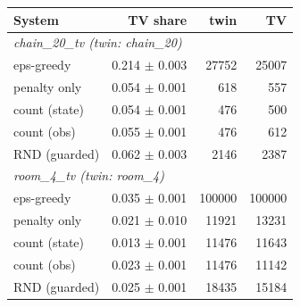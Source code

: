 \begin{tabular}{lrrr}
\hline
System & TV share & twin & TV \\
\hline
\multicolumn{4}{l}{\emph{chain\_20\_tv (twin: chain\_20)}} \\
eps-greedy & 0.214 $\pm$ 0.003 & 27752 & 25007 \\
penalty only & 0.054 $\pm$ 0.001 & 618 & 557 \\
count (state) & 0.054 $\pm$ 0.001 & 476 & 500 \\
count (obs) & 0.055 $\pm$ 0.001 & 476 & 612 \\
RND (guarded) & 0.062 $\pm$ 0.003 & 2146 & 2387 \\
\hline
\multicolumn{4}{l}{\emph{room\_4\_tv (twin: room\_4)}} \\
eps-greedy & 0.035 $\pm$ 0.001 & 100000 & 100000 \\
penalty only & 0.021 $\pm$ 0.010 & 11921 & 13231 \\
count (state) & 0.013 $\pm$ 0.001 & 11476 & 11643 \\
count (obs) & 0.023 $\pm$ 0.001 & 11476 & 11142 \\
RND (guarded) & 0.025 $\pm$ 0.001 & 18435 & 15184 \\
\hline
\end{tabular}
